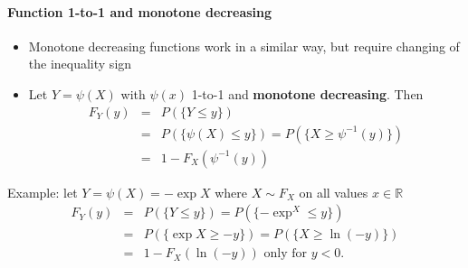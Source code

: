 \documentclass[smaller]{beamer}\usepackage[]{graphicx}\usepackage[]{color}
\renewcommand{\Pr}{P}
\newenvironment{stepitemize}{\begin{itemize}[<+->]}{\end{itemize} }
\begin{document}
\begin{frame}{\secname}
  \framesubtitle{Function 1-to-1 and monotone decreasing}

  \begin{stepitemize}
  \item Monotone decreasing functions work in a similar way, but require
  changing of the inequality sign

  \item Let $Y=\psi \left( X\right) $ with $\psi \left( x\right) $ 1-to-1 and
  \textbf{monotone decreasing}. Then
  \begin{eqnarray*}
  F_{Y}\left( y\right) &=&\Pr \left( \{ Y\leq y \} \right) \\
  &=&\Pr \left( \{ \psi \left( X\right) \leq y \} \right) =\Pr \left( \{ X\geq \psi
  ^{-1}\left( y\right) \} \right) \\
  &=&1-F_{X}\left( \psi ^{-1}\left( y\right) \right)
  \end{eqnarray*}

  \end{stepitemize}
  \begin{example}
  Example: let $Y=\psi \left( X\right) =-\exp X $ where $%
  X\sim F_X$ on all values $x\in
  \mathbb{R}
  $%
  \begin{eqnarray*}
  F_{Y}\left( y\right) &=&\Pr \left( \{ Y\leq y \}\right) =\Pr \left( \{ -\exp ^
  X \leq y \} \right) \\
  &=&\Pr \left( \{ \exp X \geq -y \} \right) =\Pr \left( \{ X\geq \ln
  \left( -y\right) \} \right) \\
  &=&1-F_{X}\left( \ln \left( -y\right) \right) \text{ only for }y<0\text{.}
  \end{eqnarray*}
  \end{example}
\end{frame}
\end{document}
